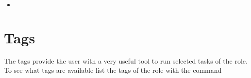 \documentclass[letterpaper,10pt,english]{sphinxmanual}
\begin{document}

\begin{itemize}
\item {} 

\end{itemize}




\section{Tags}
\label{\detokenize{guide:tags}}\label{\detokenize{guide:ug-tags}}
The tags provide the user with a very useful tool to run selected
tasks of the role. To see what tags are available list the tags of the
role with the command
\end{document}
